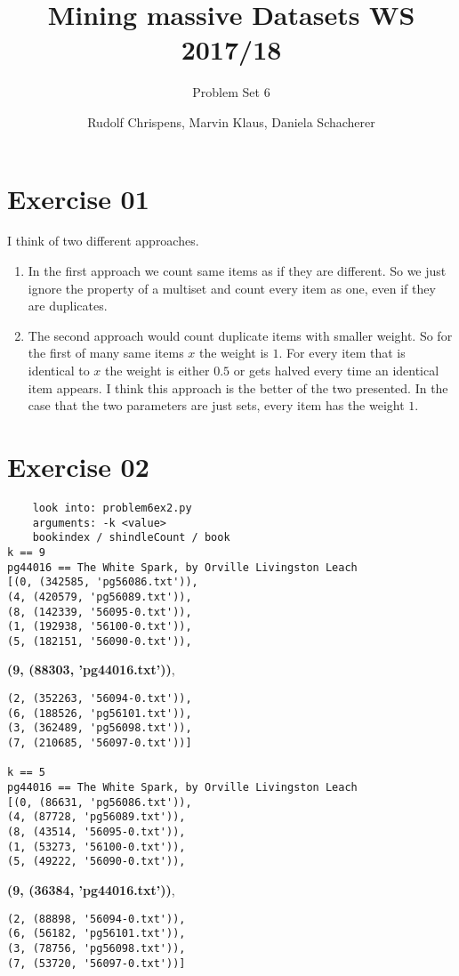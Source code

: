 \documentclass[11pt,a4paper]{scrartcl}
\title{Mining massive Datasets WS 2017/18}
\subtitle{Problem Set 6}
\author{Rudolf Chrispens, Marvin Klaus, Daniela Schacherer}
\begin{document}
\maketitle

\section*{Exercise 01}

I think of two different approaches.
\begin{enumerate}
\item In the first approach we count same items as if they are different. So we just ignore the property of a multiset and count every item as one, even if they are duplicates.
\item The second approach would count duplicate items with smaller weight. So for the first of many same items $x$ the weight is $1$. For every item that is identical to $x$ the weight is either $0.5$ or gets halved every time an identical item appears. I think this approach is the better of the two presented. In the case that the two parameters are just sets, every item has the weight $1$.
\end{enumerate}

\section*{Exercise 02}
\begin{verbatim}
	look into: problem6ex2.py
	arguments: -k <value>
	bookindex / shindleCount / book
k == 9
pg44016 == The White Spark, by Orville Livingston Leach
[(0, (342585, 'pg56086.txt')),
(4, (420579, 'pg56089.txt')),
(8, (142339, '56095-0.txt')), 
(1, (192938, '56100-0.txt')),
(5, (182151, '56090-0.txt')),\end{verbatim}
\textbf{(9, (88303, 'pg44016.txt'))},
\begin{verbatim}
(2, (352263, '56094-0.txt')),
(6, (188526, 'pg56101.txt')),
(3, (362489, 'pg56098.txt')),
(7, (210685, '56097-0.txt'))]

k == 5
pg44016 == The White Spark, by Orville Livingston Leach
[(0, (86631, 'pg56086.txt')), 
(4, (87728, 'pg56089.txt')), 
(8, (43514, '56095-0.txt')), 
(1, (53273, '56100-0.txt')), 
(5, (49222, '56090-0.txt')), 
\end{verbatim}
\textbf{(9, (36384, 'pg44016.txt'))}, 
\begin{verbatim}
(2, (88898, '56094-0.txt')), 
(6, (56182, 'pg56101.txt')), 
(3, (78756, 'pg56098.txt')), 
(7, (53720, '56097-0.txt'))]
\end{verbatim}
\end{document}
